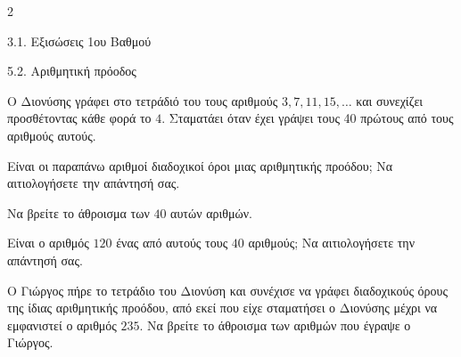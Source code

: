 \begin{ylh}{2}
    \item 3.1. Εξισώσεις 1ου Βαθμού
    \item 5.2. Αριθμητική πρόοδος
\end{ylh}
Ο Διονύσης γράφει στο τετράδιό του τους αριθμούς $3, 7, 11, 15,\ldots$ και συνεχίζει\\
προσθέτοντας κάθε φορά το $4$. Σταματάει όταν έχει γράψει τους 40 πρώτους από τους αριθμούς αυτούς.

\begin{alist}
\item Είναι οι παραπάνω αριθμοί διαδοχικοί όροι μιας αριθμητικής προόδου; Να αιτιολογήσετε την απάντησή σας.
\item Να βρείτε το άθροισμα των $40$ αυτών αριθμών.
\item Είναι ο αριθμός $120$ ένας από αυτούς τους $40$ αριθμούς; Να αιτιολογήσετε την απάντησή σας.

\item Ο Γιώργος πήρε το τετράδιο του Διονύση και συνέχισε να γράφει διαδοχικούς όρους της ίδιας αριθμητικής προόδου, από εκεί που είχε σταματήσει ο Διονύσης μέχρι να εμφανιστεί ο αριθμός $235$. Να βρείτε το άθροισμα των αριθμών που έγραψε ο Γιώργος.
\end{alist}

